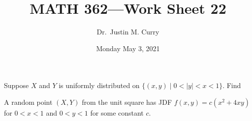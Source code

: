 \documentclass[addpoints,12pt]{exam}
\title{\vspace{-1in} MATH 362---Work Sheet 22}
\date{Monday May 3, 2021}
\author{Dr.~Justin M. Curry}
\begin{document}
\maketitle





\begin{questions}

\question[4] Suppose $X$ and $Y$ is uniformly distributed on $\{(x,y) \mid 0 < |y| < x < 1\}$. Find

\noaddpoints
{}
\addpoints

\newpage
\question[3] A random point $(X,Y)$ from the unit square has JDF $f(x,y)=c(x^2+4xy)$ for $0<x<1$ and $0<y<1$ for some constant $c$.

\noaddpoints
\begin{parts}


\end{parts}
\end{questions}
\end{document}
